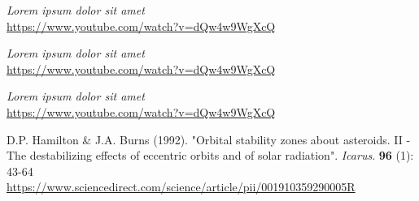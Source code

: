 
\begin{thebibliography}{00}

  \textit{Lorem ipsum dolor sit amet} \\
  \url{https://www.youtube.com/watch?v=dQw4w9WgXcQ}

  \textit{Lorem ipsum dolor sit amet} \\
  \url{https://www.youtube.com/watch?v=dQw4w9WgXcQ}

  \textit{Lorem ipsum dolor sit amet} \\
  \url{https://www.youtube.com/watch?v=dQw4w9WgXcQ}

  D.P. Hamilton \& J.A. Burns (1992). "Orbital stability zones about asteroids.
  II - The destabilizing effects of eccentric orbits and of solar radiation".
  \textit{Icarus}. \textbf{96} (1): 43-64 \\
  \url{https://www.sciencedirect.com/science/article/pii/001910359290005R}

\end{thebibliography}

